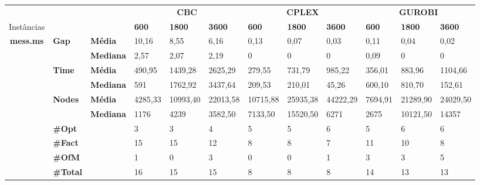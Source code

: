 \documentclass[]{article}
\begin{document}
	
	\begin{table}[]
		\begin{adjustbox}{angle=90}
			\begin{tabular}{cll|lll|lll|lll}
				& & & \multicolumn{3}{c}{\textbf{CBC}} & \multicolumn{3}{c}{\textbf{CPLEX}} & \multicolumn{3}{c}{\textbf{GUROBI}} 	\\Instâncias & & & \textbf{600} & \textbf{1800} & \textbf{3600} & \textbf{600} & \textbf{1800} & \textbf{3600} & \textbf{600} & \textbf{1800} & \textbf{3600} \\
				\hline
				\multirow{7}{*}{\textbf{mess.ms}} & \multirow{2}{*}{\textbf{Gap}} & \textbf{Média} & 10,16 & 8,55 & 6,16 & 0,13 & 0,07 & 0,03 & 0,11 & 0,04 & 0,02 \\
				& & \textbf{Mediana} & 2,57 & 2,07 & 2,19 & 0 & 0 & 0 & 0,09 & 0 & 0 \\
				\cline{2-12}
				& \multirow{2}{*}{\textbf{Time}} & \textbf{Média} & 490,95 & 1439,28 & 2625,29 & 279,55 & 731,79 & 985,22 & 356,01 & 883,96 & 1104,66 \\
				& & \textbf{Mediana} & 591 & 1762,92 & 3437,64 & 209,53 & 210,01 & 45,26 & 600,10 & 810,70 & 152,61 \\
				\cline{2-12}
				& \multirow{2}{*}{\textbf{Nodes}} & \textbf{Média} & 4285,33 & 10993,40 & 22013,58 & 10715,88 & 25935,38 & 44222,29 & 7694,91 & 21289,90 & 24029,50 \\
				& & \textbf{Mediana} & 1176 & 4239 & 3582,50 & 7133,50 & 15520,50 & 6271 & 2675 & 10121,50 & 14357 \\
				\cline{2-12}
				& \textbf{\#Opt} & & 3 & 3 & 4 & 5 & 5 & 6 & 5 & 6 & 6 \\
				& \textbf{\#Fact} & & 15 & 15 & 12 & 8 & 8 & 7 & 11 & 10 & 8 \\
				& \textbf{\#OfM} & & 1 & 0 & 3 & 0 & 0 & 1 & 3 & 3 & 5 \\
				& \textbf{\#Total} & & 16 & 15 & 15 & 8 & 8 & 8 & 14 & 13 & 13 \\
			\end{tabular}
		\end{adjustbox}
	\end{table}
\end{document}
